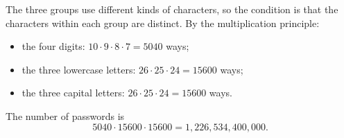 The three groups use different kinds of characters, so the condition is that the characters within each group are distinct. By the multiplication principle:
\begin{itemize}
\item the four digits: $10\cdot9\cdot8\cdot7=5040$ ways;
\item the three lowercase letters: $26\cdot25\cdot24=15600$ ways;
\item the three capital letters: $26\cdot25\cdot24=15600$ ways.
\end{itemize}
The number of passwords is
\[5040\cdot15600\cdot15600=\boxed{1{,}226{,}534{,}400{,}000}.\]
